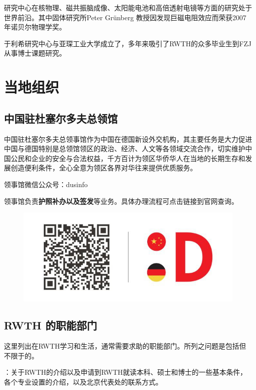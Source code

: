    研究中心在核物理、磁共振脑成像、太阳能电池和高倍透射电镜等方面的研究处于世界前沿。其中固体研究所Peter Grünberg 教授因发现巨磁电阻效应而荣获2007年诺贝尔物理学奖。

    于利希研究中心与亚琛工业大学成立了\href{https://www.jara.org/en/}{}，多年来吸引了RWTH的众多毕业生到FZJ从事博士课题研究。

\section{当地组织}\label{sec:当地组织}

  \subsection{中国驻杜塞尔多夫总领馆}\label{subsec:中国驻杜塞尔多夫总领馆}

    中国驻杜塞尔多夫总领事馆作为中国在德国新设外交机构，其主要任务是大力促进中国与德国特别是总领馆领区的政治、经济、人文等各领域交流合作，切实维护中国公民和企业的安全与合法权益，千方百计为领区华侨华人在当地的长期生存和发展创造便利条件，全心全意为领区各界对华往来提供优质服务。

    领事馆微信公众号：dusinfo

    领事馆负责\textbf{护照补办以及签发}等业务。具体办理流程可点击链接到官网查询。

    \begin{figure}[h]
      \centering
      \includegraphics[width=.5\textwidth]{Aachen及周边/Düsseldorf.png}
    \end{figure}

  \subsection{RWTH 的职能部门}\label{subsec:RWTH 的职能部门}

    这里列出在RWTH学习和生活，通常需要求助的职能部门。所列之问题是包括但不限于的。

    \href{https://www9.rwth-aachen.de/go/id/xga/}{}：关于RWTH的介绍以及申请到RWTH就读本科、硕士和博士的一些基本条件，各个专业设置的介绍，以及北京代表处的联系方式。

